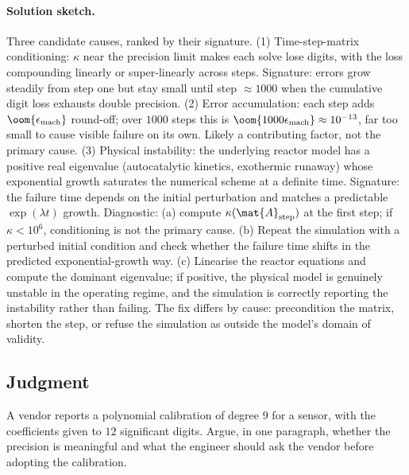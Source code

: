 \paragraph{Solution sketch.}
Three candidate causes, ranked by their signature. (1)
Time-step-matrix conditioning: $\kappa$ near the precision limit
makes each solve lose digits, with the loss compounding linearly
or super-linearly across steps. Signature: errors grow steadily
from step one but stay small until step $\approx 1000$ when the
cumulative digit loss exhausts double precision. (2) Error
accumulation: each step adds $\oom{\epsilon_{\text{mach}}}$
round-off; over $1000$ steps this is $\oom{1000 \epsilon_{\text{mach}}}
\approx 10^{-13}$, far too small to cause visible failure on its
own. Likely a contributing factor, not the primary cause. (3)
Physical instability: the underlying reactor model has a positive
real eigenvalue (autocatalytic kinetics, exothermic runaway) whose
exponential growth saturates the numerical scheme at a definite
time. Signature: the failure time depends on the initial
perturbation and matches a predictable $\exp(\lambda t)$ growth.
Diagnostic: (a) compute $\kappa(\mat{A}_{\text{step}})$ at the
first step; if $\kappa < 10^{6}$, conditioning is not the
primary cause. (b) Repeat the simulation with a perturbed initial
condition and check whether the failure time shifts in the
predicted exponential-growth way. (c) Linearise the reactor
equations and compute the dominant eigenvalue; if positive, the
physical model is genuinely unstable in the operating regime, and
the simulation is correctly reporting the instability rather than
failing. The fix differs by cause: precondition the matrix,
shorten the step, or refuse the simulation as outside the model's
domain of validity.

\subsection*{Judgment}

\begin{exercise}
A vendor reports a polynomial calibration of degree $9$ for a
sensor, with the coefficients given to $12$ significant digits.
Argue, in one paragraph, whether the precision is meaningful
and what the engineer should ask the vendor before adopting the
calibration.
\end{exercise}

